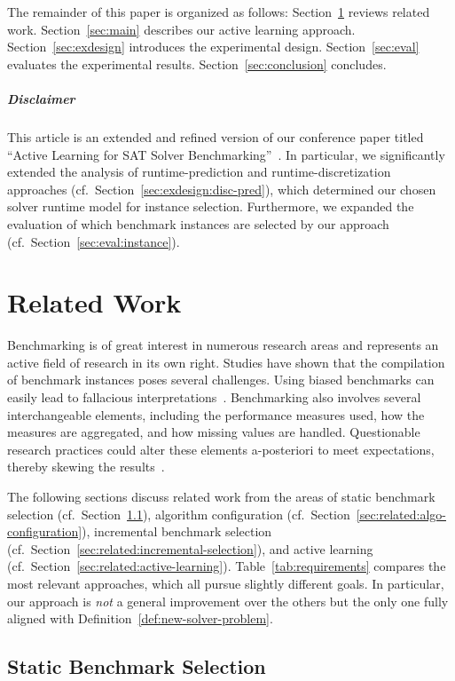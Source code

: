 \documentclass[sn-basic, Numbered]{sn-jnl} %
\begin{document}
The remainder of this paper is organized as follows:
Section~\ref{sec:related} reviews related work.
Section~\ref{sec:main} describes our active learning approach.
Section~\ref{sec:exdesign} introduces the experimental design.
Section~\ref{sec:eval} evaluates the experimental results.
Section~\ref{sec:conclusion} concludes.

\subparagraph{Disclaimer}

This article is an extended and refined version of our conference paper titled ``Active Learning for SAT Solver Benchmarking''~\cite{fuchs2023active}.
In particular, we significantly extended the analysis of runtime-prediction and runtime-discretization approaches (cf.~Section~\ref{sec:exdesign:disc-pred}), which determined our chosen solver runtime model for instance selection.
Furthermore, we expanded the evaluation of which benchmark instances are selected by our approach (cf.~Section~\ref{sec:eval:instance}).

\section{Related Work}
\label{sec:related}

Benchmarking is of great interest in numerous research areas and represents an active field of research in its own right.
Studies have shown that the compilation of benchmark instances poses several challenges.
Using biased benchmarks can easily lead to fallacious interpretations~\cite{abs-2107-07002}.
Benchmarking also involves several interchangeable elements, including the performance measures used, how the measures are aggregated, and how missing values are handled.
Questionable research practices could alter these elements a-posteriori to meet expectations, thereby skewing the results~\cite{NiesslHWCB22}.

The following sections discuss related work from the areas of static benchmark selection (cf.~Section~\ref{sec:related:static-selection}), algorithm configuration (cf.~Section~\ref{sec:related:algo-configuration}), incremental benchmark selection (cf.~Section~\ref{sec:related:incremental-selection}), and active learning (cf.~Section~\ref{sec:related:active-learning}).
Table~\ref{tab:requirements} compares the most relevant approaches, which all pursue slightly different goals.
In particular, our approach is \emph{not} a general improvement over the others but the only one fully aligned with Definition~\ref{def:new-solver-problem}.

\subsection{Static Benchmark Selection}
\label{sec:related:static-selection}
\end{document}
